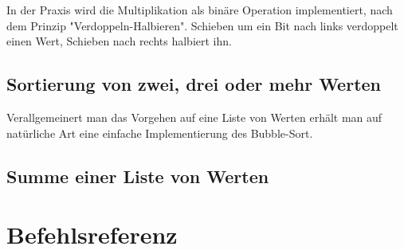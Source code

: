 \documentclass[11pt]{scrartcl}
\begin{document}


In der Praxis wird die Multiplikation als binäre Operation
implementiert, nach dem Prinzip "Verdoppeln-Halbieren". Schieben um
ein Bit nach links verdoppelt einen Wert, Schieben nach rechts
halbiert ihn.




\subsection{Sortierung von zwei, drei oder mehr Werten}
\label{sec:example_sort}








Verallgemeinert man das Vorgehen auf eine Liste von Werten erhält man
auf natürliche Art eine einfache Implementierung des Bubble-Sort.
\subsection{Summe einer Liste von Werten}
\label{sec:example_sum_list}





\appendix
\newpage
\section{Befehlsreferenz}
\label{sec:instruction_reference}
\end{document}
